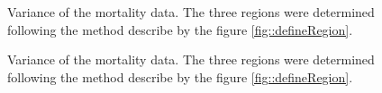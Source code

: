 \documentclass[letterpaper, 12pt]{article}
\theoremstyle{theo}
\begin{document}
\begin{refsection}
\begin{onehalfspace}
\begin{figure}
	\centering
	
	\caption{Variance of the mortality data. The three regions were determined following the method describe by the figure \ref{fig::defineRegion}. \label{fig::mortalityVar10-12}}
\end{figure}

\begin{figure}
	\centering
	
	\caption{Variance of the mortality data. The three regions were determined following the method describe by the figure \ref{fig::defineRegion}. \label{fig::mortalityVar13-14}}
\end{figure}

\end{onehalfspace}

\clearpage
\printbibliography[heading=subbibliography]
\end{refsection}
\end{document}
